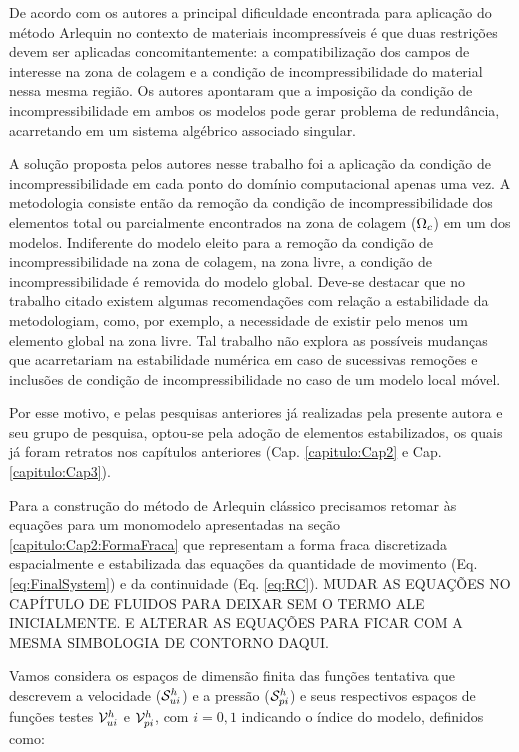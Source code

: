 \documentclass[tese_patricia]{subfiles}
\begin{document}
De acordo com os autores  a principal dificuldade encontrada para aplicação do método Arlequin no contexto de materiais incompressíveis é que duas restrições devem ser aplicadas concomitantemente: a compatibilização dos campos de interesse na zona de colagem e a condição de incompressibilidade do material nessa mesma região. Os autores apontaram que a imposição da condição de incompressibilidade em ambos os modelos pode gerar problema de redundância, acarretando em um sistema algébrico associado singular.

A solução proposta pelos autores nesse trabalho foi a aplicação da condição de incompressibilidade em cada ponto do domínio computacional apenas uma vez. A metodologia consiste então da remoção da condição de incompressibilidade dos elementos total ou parcialmente encontrados na zona de colagem ($\Omega_c$) em um dos modelos. Indiferente do modelo eleito para a remoção da condição de incompressibilidade na zona de colagem, na zona livre, a condição de incompressibilidade é removida do modelo global. Deve-se destacar que no trabalho citado existem algumas recomendações com relação a estabilidade da metodologiam, como, por exemplo, a necessidade de existir pelo menos um elemento global na zona livre. Tal trabalho não explora as possíveis mudanças que acarretariam na estabilidade numérica em caso de sucessivas remoções e inclusões de condição de incompressibilidade no caso de um modelo local móvel.

Por esse motivo, e pelas pesquisas anteriores já realizadas pela presente autora e seu grupo de pesquisa, optou-se pela adoção de elementos estabilizados, os quais já foram retratos nos capítulos anteriores (Cap. \ref{capitulo:Cap2} e Cap. \ref{capitulo:Cap3}).

Para a construção do método de Arlequin clássico precisamos retomar às equações para um monomodelo apresentadas na seção \ref{capitulo:Cap2:FormaFraca} que representam a forma fraca discretizada espacialmente e estabilizada das equações da quantidade de movimento (Eq. \ref{eq:FinalSystem}) e da continuidade (Eq. \ref{eq:RC}). MUDAR AS EQUAÇÕES NO CAPÍTULO DE FLUIDOS PARA DEIXAR SEM O TERMO ALE INICIALMENTE. E ALTERAR AS EQUAÇÕES PARA FICAR COM A MESMA SIMBOLOGIA DE CONTORNO DAQUI.

Vamos considera os espaços de dimensão finita das funções tentativa que descrevem a velocidade ($\mathcal{S}_{ui}^h$) e a pressão ($\mathcal{S}_{pi}^h$) e seus respectivos espaços de funções testes $\mathcal{V}_{ui}^h$ e $\mathcal{V}_{pi}^h$, com $i = 0,1$ indicando o índice do modelo, definidos como:
\end{document}

